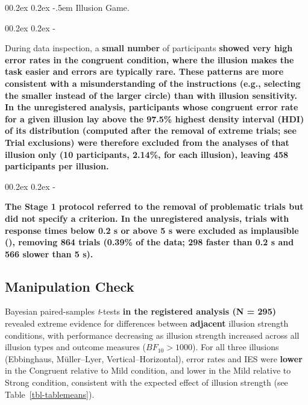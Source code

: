 \documentclass[
  man,
  floatsintext,
  longtable,
  nolmodern,
  notxfonts,
  notimes,
  colorlinks=true,linkcolor=blue,citecolor=blue,urlcolor=blue]{apa7}
\makeatletter
\renewcommand{\paragraph}{\@startsection{paragraph}{4}{\parindent}%
	{0\baselineskip \@plus 0.2ex \@minus 0.2ex}%
	{-.5em}%
	{\normalfont\normalsize\bfseries\typesectitle}}
\renewcommand{\subparagraph}[1]{\@startsection{subparagraph}{5}{0.5em}%
	{0\baselineskip \@plus 0.2ex \@minus 0.2ex}%
	{-\z@\relax}%
	{\normalfont\normalsize\bfseries\itshape\hspace{\parindent}{#1}\textit{\addperi}}{\relax}}
\makeatother
\begin{document}
\paragraph{Illusion Game.}\label{illusion-game-1}

\subparagraph{Participant exclusions (per
illusion).}\label{participant-exclusions-per-illusion}

During data inspection, a \textbf{small number} of participants
\textbf{showed very high error rates in the congruent condition, where
the illusion makes the task easier and errors are typically rare. These
patterns are more consistent with a misunderstanding of the instructions
(e.g., selecting the smaller instead of the larger circle) than with
illusion sensitivity. In the unregistered analysis, participants whose
congruent error rate for a given illusion lay above the 97.5\% highest
density interval (HDI) of its distribution (computed after the removal
of extreme trials; see Trial exclusions) were therefore excluded from
the analyses of that illusion only (10 participants, 2.14\%, for each
illusion), leaving 458 participants per illusion.}

\subparagraph{Trial exclusions.}\label{trial-exclusions}

\textbf{The Stage 1 protocol referred to the removal of problematic
trials but did not specify a criterion. In the unregistered analysis,
trials with response times below 0.2 s or above 5 s were excluded as
implausible (),
removing 864 trials (0.39\% of the data; 298 faster than 0.2 s and 566
slower than 5 s).}

\subsection{Manipulation Check}\label{manipulation-check}

Bayesian paired-samples \emph{t}-tests \textbf{in the registered
analysis (N = 295)} revealed extreme evidence for differences between
\textbf{adjacent} illusion strength conditions, with performance
decreasing as illusion strength increased across all illusion types and
outcome measures (\(BF_{10} > 1000\)). For all three illusions
(Ebbinghaus, Müller--Lyer, Vertical--Horizontal), error rates and IES
were \textbf{lower} in the Congruent relative to Mild condition, and
lower in the Mild relative to Strong condition, consistent with the
expected effect of illusion strength (see Table~\ref{tbl-tablemeans}).
\end{document}
